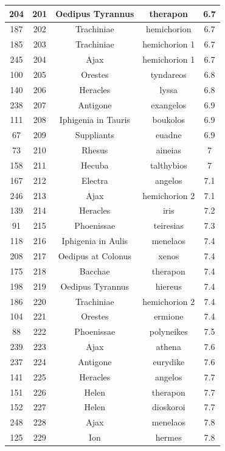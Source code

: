 \documentclass{jcls}
\begin{document}
\begin{longtable}{|c|c|c|c|c|}
  204 & 201 & Oedipus Tyrannus & therapon & 6.7 \\ \hline
  187 & 202 & Trachiniae & hemichorion & 6.7 \\ \hline
  185 & 203 & Trachiniae & hemichorion 1 & 6.7 \\ \hline
  245 & 204 & Ajax & hemichorion 1 & 6.7 \\ \hline
  100 & 205 & Orestes & tyndareos & 6.8 \\ \hline
  140 & 206 & Heracles & lyssa & 6.8 \\ \hline
  238 & 207 & Antigone & exangelos & 6.9 \\ \hline
  111 & 208 & Iphigenia in Tauris & boukolos & 6.9 \\ \hline
  67 & 209 & Suppliants & euadne & 6.9 \\ \hline
  73 & 210 & Rhesus & aineias & 7 \\ \hline
  158 & 211 & Hecuba & talthybios & 7 \\ \hline
  167 & 212 & Electra & angelos & 7.1 \\ \hline
  246 & 213 & Ajax & hemichorion 2 & 7.1 \\ \hline
  139 & 214 & Heracles & iris & 7.2 \\ \hline
  91 & 215 & Phoenissae & teiresias & 7.3 \\ \hline
  118 & 216 & Iphigenia in Aulis & menelaos & 7.4 \\ \hline
  208 & 217 & Oedipus at Colonus & xenos & 7.4 \\ \hline
  175 & 218 & Bacchae & therapon & 7.4 \\ \hline
  198 & 219 & Oedipus Tyrannus & hiereus & 7.4 \\ \hline
  186 & 220 & Trachiniae & hemichorion 2 & 7.4 \\ \hline
  104 & 221 & Orestes & ermione & 7.4 \\ \hline
  88 & 222 & Phoenissae & polyneikes & 7.5 \\ \hline
  239 & 223 & Ajax & athena & 7.6 \\ \hline
  237 & 224 & Antigone & eurydike & 7.6 \\ \hline
  141 & 225 & Heracles & angelos & 7.7 \\ \hline
  151 & 226 & Helen & therapon & 7.7 \\ \hline
  152 & 227 & Helen & dioskoroi & 7.7 \\ \hline
  248 & 228 & Ajax & menelaos & 7.8 \\ \hline
  125 & 229 & Ion & hermes & 7.8 \\ \hline

\end{longtable}
\end{document}
